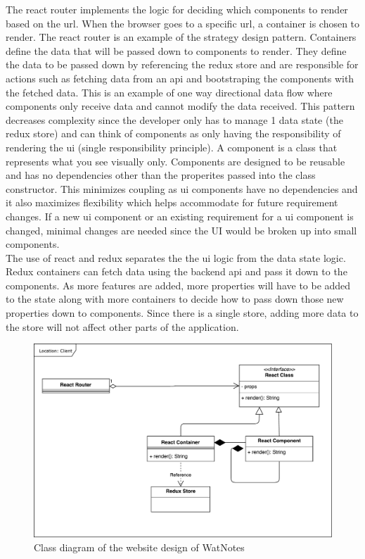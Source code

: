 \documentclass[12pt]{article}
\begin{document}
  The react router implements the logic for deciding which components to render based on the url. When the browser goes to a specific url, a container is chosen to render. The react router is an example of the strategy design pattern. Containers define the data that will be passed down to components to render. They define the data to be passed down by referencing the redux store and are responsible for actions such as fetching data from an api and bootstraping the components with the fetched data. This is an example of one way directional data flow where components only receive data and cannot modify the data received. This pattern decreases complexity since the developer only has to manage 1 data state (the redux store) and can think of components as only having the responsibility of rendering the ui (single responsibility principle). A component is a class that represents what you see visually only. Components are designed to be reusable and has no dependencies other than the properites passed into the class constructor. This minimizes coupling as ui components have no dependencies and it also maximizes flexibility which helps accommodate for future requirement changes. If a new ui component or an existing requirement for a ui component is changed, minimal changes are needed since the UI would be broken up into small components.\\

  The use of react and redux separates the the ui logic from the data state logic. Redux containers can fetch data using the backend api and pass it down to the components. As more features are added, more properties will have to be added to the state along with more containers to decide how to pass down those new properties down to components. Since there is a single store, adding more data to the store will not affect other parts of the application.

  \begin{figure}[H]
    \centering
    \includegraphics[width=\textwidth]{assets/frontend_design.pdf}
    \caption{Class diagram of the website design of WatNotes}
  \end{figure}
\end{document}
